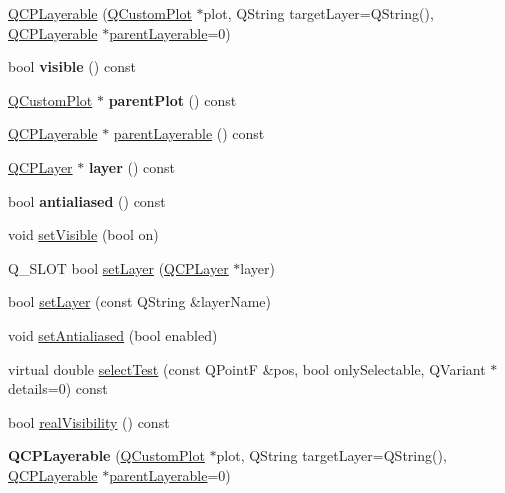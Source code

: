 \begin{DoxyCompactItemize}
\item 
\hyperlink{class_q_c_p_layerable_a74c0fa237f29bf0e49565013fc5d1ec0}{Q\+C\+P\+Layerable} (\hyperlink{class_q_custom_plot}{Q\+Custom\+Plot} $\ast$plot, Q\+String target\+Layer=Q\+String(), \hyperlink{class_q_c_p_layerable}{Q\+C\+P\+Layerable} $\ast$\hyperlink{class_q_c_p_layerable_a98d79f5b716d45eac4347befe546d0ec}{parent\+Layerable}=0)
\item 
bool {\bfseries visible} () const \hypertarget{class_q_c_p_layerable_a10a3cc92e0fa63e4a929e61d34e275a7}{}\label{class_q_c_p_layerable_a10a3cc92e0fa63e4a929e61d34e275a7}

\item 
\hyperlink{class_q_custom_plot}{Q\+Custom\+Plot} $\ast$ {\bfseries parent\+Plot} () const \hypertarget{class_q_c_p_layerable_ab7e0e94461566093d36ffc0f5312b109}{}\label{class_q_c_p_layerable_ab7e0e94461566093d36ffc0f5312b109}

\item 
\hyperlink{class_q_c_p_layerable}{Q\+C\+P\+Layerable} $\ast$ \hyperlink{class_q_c_p_layerable_a98d79f5b716d45eac4347befe546d0ec}{parent\+Layerable} () const 
\item 
\hyperlink{class_q_c_p_layer}{Q\+C\+P\+Layer} $\ast$ {\bfseries layer} () const \hypertarget{class_q_c_p_layerable_aea67e8c19145e70d68c286a36f6b8300}{}\label{class_q_c_p_layerable_aea67e8c19145e70d68c286a36f6b8300}

\item 
bool {\bfseries antialiased} () const \hypertarget{class_q_c_p_layerable_aef5cb4aa899ed9dc9384fd614560291e}{}\label{class_q_c_p_layerable_aef5cb4aa899ed9dc9384fd614560291e}

\item 
void \hyperlink{class_q_c_p_layerable_a3bed99ddc396b48ce3ebfdc0418744f8}{set\+Visible} (bool on)
\item 
Q\+\_\+\+S\+L\+OT bool \hyperlink{class_q_c_p_layerable_ab0d0da6d2de45a118886d2c8e16d5a54}{set\+Layer} (\hyperlink{class_q_c_p_layer}{Q\+C\+P\+Layer} $\ast$layer)
\item 
bool \hyperlink{class_q_c_p_layerable_ab25a0e7b897993b44447caee0f142083}{set\+Layer} (const Q\+String \&layer\+Name)
\item 
void \hyperlink{class_q_c_p_layerable_a4fd43e89be4a553ead41652565ff0581}{set\+Antialiased} (bool enabled)
\item 
virtual double \hyperlink{class_q_c_p_layerable_a4001c4d0dfec55598efa4d531f2179a9}{select\+Test} (const Q\+PointF \&pos, bool only\+Selectable, Q\+Variant $\ast$details=0) const 
\item 
bool \hyperlink{class_q_c_p_layerable_a30809f7455e9794bca7b6c737622fa63}{real\+Visibility} () const 
\item 
{\bfseries Q\+C\+P\+Layerable} (\hyperlink{class_q_custom_plot}{Q\+Custom\+Plot} $\ast$plot, Q\+String target\+Layer=Q\+String(), \hyperlink{class_q_c_p_layerable}{Q\+C\+P\+Layerable} $\ast$\hyperlink{class_q_c_p_layerable_a98d79f5b716d45eac4347befe546d0ec}{parent\+Layerable}=0)\hypertarget{class_q_c_p_layerable_a74c0fa237f29bf0e49565013fc5d1ec0}{}\label{class_q_c_p_layerable_a74c0fa237f29bf0e49565013fc5d1ec0}


\end{DoxyCompactItemize}
